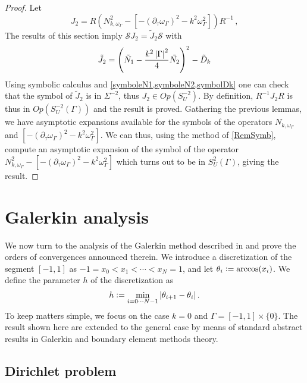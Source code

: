 \documentclass[a4paper]{article}
\begin{document}
\begin{proof}
	Let 
	\[J_2 = R\left( N_{k,\omega_\Gamma}^2 - \left[-(\partial_\tau \omega_\Gamma )^2 - k^2\omega_\Gamma^2\right]\right)R^{-1}\,,\]
	The results of this section imply $\mathcal{S}J_2 = \tilde{J}_2 \mathcal{S}$
	with
	\[\tilde{J}_2 = \left( \tilde{N}_1 - \frac{k^2\left\lvert \Gamma \right\rvert^2}{4} \tilde{N_2}\right)^2 - \tilde{D}_k\]
	Using symbolic calculus and \cref{symboleN1,symboleN2,symbolDk} one can check that the symbol of $\tilde{J}_2$ is in $\Sigma^{-2}$, thus $J_2 \in \textit{Op}(S_U^{-2})$. By definition, $R^{-1}J_2 R$ is thus in $\textit{Op}(S_U^{-2}(\Gamma))$ and the result is proved. 
	Gathering the previous lemmas, we have asymptotic expansions available for the symbols of the operators $N_{k,\omega_\Gamma}$ and $\left[-(\partial_\tau \omega_\Gamma )^2 - k^2\omega_\Gamma^2\right]$. We can thus, using the method of \autoref{RemSymb}, compute an asymptotic expansion of the symbol of the operator $N_{k,\omega_\Gamma}^2 - \left[-(\partial_\tau \omega_\Gamma )^2 - k^2\omega_\Gamma^2\right]$
	which turns out to be in $S^2_U(\Gamma)$, giving the result. 
\end{proof}


\section{Galerkin analysis}

\label{subsec:GalerkineSetting}

We now turn to the analysis of the Galerkin method described in \cite{alouges2018new} and prove the orders of convergences announced therein. We introduce a discretization of the segment $[-1,1]$ as $-1 = x_0 < x_1 < \cdots < x_N = 1$, and let $\theta_i \mathrel{\mathop:}= \arccos(x_i)$. We define the parameter $h$ of the discretization as 
\[ h \mathrel{\mathop:}= \min_{i=0\cdots N-1} \left\lvert \theta_{i+1} - \theta_{i} \right\rvert.\]
To keep matters simple, we focus on the case $k = 0$ and $\Gamma = [-1,1]\times \{0\}$. The result shown here are extended to the general case by means of standard abstract results in Galerkin and boundary element methods theory. 

\subsection{Dirichlet problem}
\end{document}
